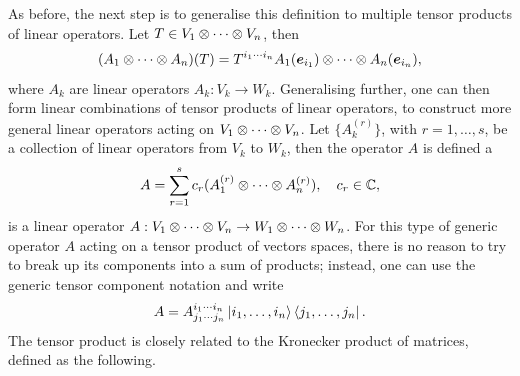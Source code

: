As before, the next step is to generalise this definition to multiple tensor products of linear operators. Let $T \in V_1 \otimes \cdots \otimes V_n$, then 
\begin{equation}
    (A_1 \otimes \cdots \otimes A_n)(T) = T^{i_1\cdots i_n}A_1(\bm{e}_{i_1}) \otimes \cdots \otimes A_n(\bm{e}_{i_n}),
\end{equation}
where $A_k$ are linear operators $A_k : V_k \to W_k$. Generalising further, one can then form linear combinations of tensor products of linear operators, to construct more general linear operators acting on $V_1 \otimes \cdots \otimes V_n$. Let $\{A_k^{(r)}\}$, with $r = 1,\dots,s$, be a collection of linear operators from $V_k$ to $W_k$, then the operator $A$ is defined a 
\begin{equation}
    A = \sum_{r=1}^sc_r(A_1^{(r)} \otimes \cdots \otimes A_n^{(r)}),\quad c_r \in \mathbb{C},
\end{equation}
is a linear operator $A : V_1 \otimes \cdots \otimes V_n \to W_1 \otimes \cdots \otimes W_n$. For this type of generic operator $A$ acting on a tensor product of vectors spaces, there is no reason to try to break up its components into a sum of products; instead, one can use the generic tensor component notation and write
\begin{equation}
    A = A^{i_1\cdots i_n}_{j_1\cdots j_n}\ket{i_1,\dots,i_n}\bra{j_1,\dots,j_n}.
\end{equation}
The tensor product is closely related to the Kronecker product of matrices, defined as the following.
